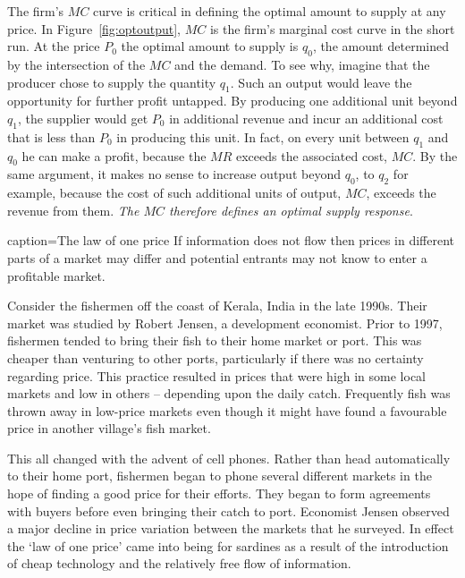 The firm's $MC$ curve is critical in defining the optimal amount to supply
at any price. In Figure~\ref{fig:optoutput}, $MC$ is the firm's marginal
cost curve in the short run. At the price $P_{0}$ the optimal amount to
supply is $q_{0}$, the amount determined by the intersection of the $MC$ and
the demand. To see why, imagine that the producer chose to supply the
quantity $q_{1}$. Such an output would leave the opportunity for further
profit untapped. By producing one additional unit beyond $q_{1}$, the
supplier would get $P_{0}$ in additional revenue and incur an additional
cost that is less than $P_{0}$ in producing this unit. In fact, on every
unit between $q_{1}$ and $q_{0}$ he can make a profit, because the $MR$
exceeds the associated cost, $MC$. By the same argument, it makes no sense
to increase output beyond $q_{0}$, to $q_{2}$ for example, because the cost
of such additional units of output, $MC$, exceeds the revenue from them. 
\textit{The $MC$ therefore defines an optimal supply response}.




\newhtmlpage

\begin{ApplicationBox}{caption={The law of one price \label{app:lawoneprice}}}
	If information does not flow then prices in different parts of a market may differ and potential entrants may not know to enter a profitable market.

	Consider the fishermen off the coast of Kerala, India in the late 1990s. Their market was studied by Robert Jensen, a development economist. Prior to 1997, fishermen tended to bring their fish to their home market or port. This was cheaper than venturing to other ports, particularly if there was no certainty regarding price. This practice resulted in prices that were high in some local markets and low in others -- depending upon the daily catch. Frequently fish was thrown away in low-price markets even though it might have found a favourable price in another village's fish market.

	This all changed with the advent of cell phones. Rather than head automatically to their home port, fishermen began to phone several different markets in the hope of finding a good price for their efforts. They began to form agreements with buyers before even bringing their catch to port. Economist Jensen observed a major decline in price variation between the markets that he surveyed. In effect the `law of one price' came into being for sardines as a result of the introduction of cheap technology and the relatively free flow of information. 
\end{ApplicationBox}


